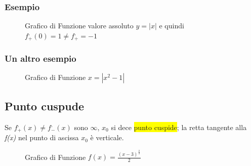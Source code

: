 \subsubsection{Esempio}
\begin{figure}[!ht]
	\centering
	\caption{Grafico di Funzione valore assoluto $y=|x|$ e quindi $f^,_+(0)=1\neq
	f^,_+=-1$}
\end{figure}
\subsubsection{Un altro esempio}
\begin{figure}[!ht]
	\centering
	\caption{Grafico di Funzione $x=|x^2-1|$}
\end{figure}
\subsection{Punto cuspude}
Se $f^,_+(x)\neq f^,_-(x)$ sono $\infty$, $x_0$ si dece \colorbox{yellow}{punto
cuspide}; la retta tangente alla \textit{f(x)} nel punto di ascissa $x_0$ è
verticale.
\begin{figure}[!ht]
	\centering
	\caption{Grafico di Funzione $f(x)=\frac{(x-3)^{\frac{2}{3}}}{2}$}
\end{figure}
